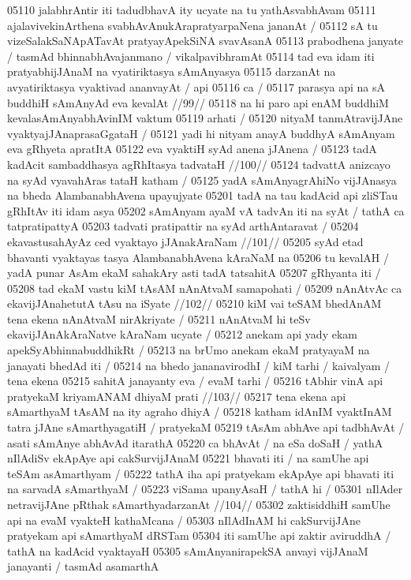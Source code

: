 05110 jalabhrAntir iti tadudbhavA ity ucyate na tu yathAsvabhAvam  
05111 ajalavivekinArthena svabhAvAnukArapratyarpaNena jananAt /  
05112 sA tu vizeSalakSaNApATavAt pratyayApekSiNA svavAsanA
05113 prabodhena janyate / tasmAd bhinnabhAvajanmano / vikalpavibhramAt
05114 tad eva idam iti pratyabhijJAnaM na vyatiriktasya sAmAnyasya  
05115 darzanAt na avyatiriktasya vyaktivad ananvayAt / api 
05116 ca / 
05117 	parasya api na sA buddhiH sAmAnyAd eva kevalAt //99//  
05118 na hi paro api enAM buddhiM kevalasAmAnyabhAvinIM  vaktum 
05119 arhati /
05120 	nityaM tanmAtravijJAne vyaktyajJAnaprasaGgataH /  
05121 yadi hi nityam anayA buddhyA sAmAnyam eva gRhyeta apratItA 
05122 eva vyaktiH syAd anena jJAnena / 
05123 	tadA kadAcit sambaddhasya agRhItasya tadvataH //100// 
05124 	tadvattA anizcayo na syAd vyavahAras tataH katham /
05125 yadA sAmAnyagrAhiNo vijJAnasya na bheda AlambanabhAvena upayujyate
05201 tadA na tau kadAcid api zliSTau gRhItAv  iti idam asya 
05202 sAmAnyam ayaM vA tadvAn iti na syAt / tathA ca tatpratipattyA  
05203 tadvati pratipattir na syAd arthAntaravat /
05204 	ekavastusahAyAz ced vyaktayo jJAnakAraNam //101// 
05205 syAd etad bhavanti vyaktayas tasya AlambanabhAvena kAraNaM na  
05206 tu kevalAH / yadA punar AsAm ekaM sahakAry asti tadA tatsahitA 
05207 gRhyanta iti /
05208 	tad ekaM vastu kiM tAsAM nAnAtvaM samapohati / 
05209 	nAnAtvAc ca ekavijJAnahetutA tAsu na iSyate //102// 
05210 kiM vai teSAM bhedAnAM tena ekena nAnAtvaM nirAkriyate /
05211 nAnAtvaM hi teSv ekavijJAnAkAraNatve kAraNam ucyate / 
05212 	anekam api yady ekam apekSyAbhinnabuddhikRt /  
05213 na brUmo anekam ekaM pratyayaM na janayati bhedAd iti /  
05214 na bhedo jananavirodhI / kiM tarhi / kaivalyam / tena ekena 
05215 sahitA janayanty eva / evaM tarhi /  
05216 	tAbhir vinA api pratyekaM kriyamANAM dhiyaM prati //103//  
05217 	tena ekena api sAmarthyaM tAsAM na ity agraho dhiyA /
05218 katham idAnIM vyaktInAM tatra jJAne sAmarthyagatiH / pratyekaM  
05219 tAsAm abhAve api tadbhAvAt / asati sAmAnye abhAvAd itarathA 
05220 ca bhAvAt / na eSa doSaH / yathA nIlAdiSv ekApAye api cakSurvijJAnaM
05221  bhavati iti / na samUhe api teSAm asAmarthyam /  
05222 tathA iha api pratyekam ekApAye api bhavati iti na sarvadA sAmarthyaM /
05223 viSama upanyAsaH / tathA hi / 
05301 	nIlAder netravijJAne pRthak sAmarthyadarzanAt //104// 
05302 	zaktisiddhiH samUhe api na evaM vyakteH kathaMcana /
05303 nIlAdInAM hi cakSurvijJAne pratyekam api sAmarthyaM dRSTam  
05304 iti samUhe api zaktir aviruddhA / tathA na kadAcid vyaktayaH 
05305 sAmAnyanirapekSA anvayi vijJAnaM janayanti / tasmAd asamarthA
